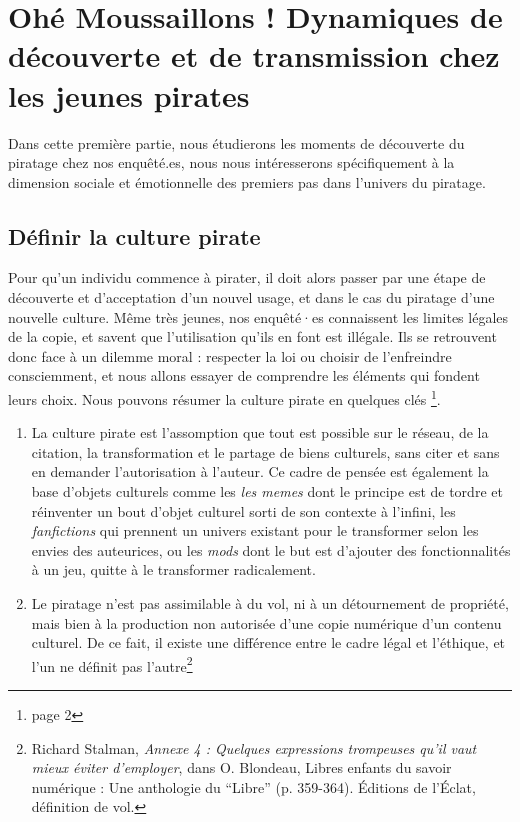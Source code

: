 \section{Ohé Moussaillons ! Dynamiques de découverte et de transmission chez les jeunes pirates}

Dans cette première partie, nous étudierons les moments de découverte du piratage chez nos enquêté.es, nous nous intéresserons spécifiquement à la dimension sociale et émotionnelle des premiers pas dans l'univers du piratage.

\subsection*{Définir la culture pirate}

Pour qu'un individu commence à pirater, il doit alors passer par une étape de découverte et d'acceptation d'un nouvel usage, et dans le cas du piratage d'une nouvelle culture. Même très jeunes, nos enquêté·es connaissent les limites légales de la copie, et savent que l'utilisation qu'ils en font est illégale. Ils se retrouvent donc face à un dilemme moral : respecter la loi ou choisir de l'enfreindre consciemment, et nous allons essayer de comprendre les éléments qui fondent leurs choix. Nous pouvons résumer la culture pirate en quelques clés \footnote{\cite{de_kosnik_rogue_2016} page 2}.

\begin{enumerate}
    \item La culture pirate est l'assomption que tout est possible sur le réseau, de la citation, la transformation et le partage de biens culturels, sans citer et sans en demander l'autorisation à l'auteur. Ce cadre de pensée est également la base d'objets culturels comme les \textit{les memes} dont le principe est de tordre et réinventer un bout d'objet culturel sorti de son contexte à l'infini, les \textit{fanfictions} qui prennent un univers existant pour le transformer selon les envies des auteurices, ou les \textit{mods} dont le but est d'ajouter des fonctionnalités à un jeu, quitte à le transformer radicalement.
    \item Le piratage n'est pas assimilable à du vol, ni à un détournement de propriété, mais bien à la production non autorisée d'une copie numérique d'un contenu culturel. De ce fait, il existe une différence entre le cadre légal et l'éthique, et l'un ne définit pas l'autre\footnote{Richard Stalman,
\textit{Annexe 4 : Quelques expressions trompeuses qu'il vaut mieux éviter d'employer}, dans O. Blondeau, Libres enfants du savoir numérique : Une anthologie du “Libre” (p. 359-364). Éditions de l'Éclat, définition de vol.}
\end{enumerate}

